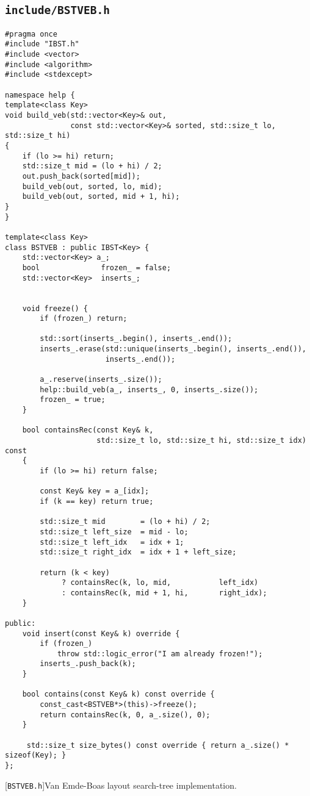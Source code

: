 \subsection{\texttt{include/BSTVEB.h}}
\label{secsec:bstveb-h}
\begin{lstlisting}
#pragma once
#include "IBST.h"
#include <vector>
#include <algorithm>
#include <stdexcept>

namespace help {
template<class Key>
void build_veb(std::vector<Key>& out,
               const std::vector<Key>& sorted, std::size_t lo, std::size_t hi)
{
    if (lo >= hi) return;                       
    std::size_t mid = (lo + hi) / 2;            
    out.push_back(sorted[mid]);                 
    build_veb(out, sorted, lo, mid);            
    build_veb(out, sorted, mid + 1, hi);        
}
} 

template<class Key>
class BSTVEB : public IBST<Key> {
    std::vector<Key> a_;            
    bool              frozen_ = false;
    std::vector<Key>  inserts_;     


    void freeze() {
        if (frozen_) return;

        std::sort(inserts_.begin(), inserts_.end());
        inserts_.erase(std::unique(inserts_.begin(), inserts_.end()),
                       inserts_.end());

        a_.reserve(inserts_.size());
        help::build_veb(a_, inserts_, 0, inserts_.size());
        frozen_ = true;
    }

    bool containsRec(const Key& k,
                     std::size_t lo, std::size_t hi, std::size_t idx) const
    {
        if (lo >= hi) return false;            

        const Key& key = a_[idx];
        if (k == key) return true;

        std::size_t mid        = (lo + hi) / 2;
        std::size_t left_size  = mid - lo;    
        std::size_t left_idx   = idx + 1;   
        std::size_t right_idx  = idx + 1 + left_size;

        return (k < key)
             ? containsRec(k, lo, mid,           left_idx)
             : containsRec(k, mid + 1, hi,       right_idx);
    }

public:
    void insert(const Key& k) override {
        if (frozen_)
            throw std::logic_error("I am already frozen!");
        inserts_.push_back(k);
    }

    bool contains(const Key& k) const override {
        const_cast<BSTVEB*>(this)->freeze();   
        return containsRec(k, 0, a_.size(), 0);
    }

     std::size_t size_bytes() const override { return a_.size() * sizeof(Key); }
};
\end{lstlisting}
[\texttt{BSTVEB.h}]{Van Emde-Boas layout search-tree
implementation.}
\label{lst:bstveb-h}


